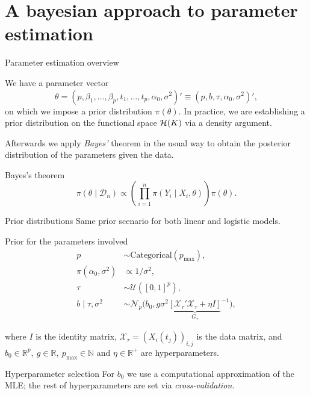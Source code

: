 \documentclass[10pt, english, professionalfonts]{beamer}
\newcommand{\N}{\mathbb{N}}
\newcommand{\R}{\mathbb{R}}
\newcommand{\Hcal}{\ensuremath\mathcal{H}}
\begin{document}
\section{A bayesian approach to parameter estimation}

\begin{frame}{Parameter estimation overview}

  We have a parameter vector
  \[
  \theta = (p, \beta_1,\dots, \beta_p, t_1,\dots, t_p, \alpha_0, \sigma^2)' \equiv (p, b, \tau, \alpha_0, \sigma^2)',
  \]
  on which we impose a prior distribution \(\pi(\theta)\). In practice, we are establishing a prior distribution on the functional space \(\Hcal(K)\) via a density argument.

  \vspace{1em}

  Afterwards we apply \textit{Bayes'} theorem in the usual way to obtain the posterior distribution of the parameters given the data.

  \begin{block}{Bayes's theorem}
      \[
      \pi(\theta \mid \mathcal D_n) \propto \left( \prod_{i=1}^n \pi(Y_i\mid X_i, \theta) \right)\pi(\theta).
      \]
  \end{block}

\end{frame}

\begin{frame}{Prior distributions}
  Same prior scenario for both linear and logistic models.
  \vspace{.5em}
  \begin{block}{Prior for the parameters involved}
    \vspace{-1em}
  \begin{align*}
    p &\sim \text{Categorical}(p_{\text{max}}),\\
  \pi(\alpha_0, \sigma^2)              & \propto 1/\sigma^2,                                                     \\
  \tau                     & \sim \mathcal U([0, 1]^p),                                              \\
  b\mid \tau, \sigma^2 & \sim \mathcal N_p\big(b_0, g\sigma^2{\underbrace{\left[\mathcal X_\tau' \mathcal X_\tau + \eta I\right]}_{G_\tau}}^{-1}\big),
\end{align*}

\vspace{-1em}
where \(I\) is the identity matrix, \(\mathcal X_\tau = (X_i(t_j))_{i,j}\) is the data matrix, and \(b_0\in \R^p, \ g \in \R, \ p_{\text{max}}\in \N\) and \(\eta \in \R^+\) are hyperparameters.
\end{block}


\vspace{1em}
\begin{alertblock}{Hyperparameter selection}
  \vspace{0.1em}
  For \(b_0\) we use a computational approximation of the MLE; the rest of hyperparameters are set via \textit{cross-validation}.
\end{alertblock}
\end{frame}
\end{document}
